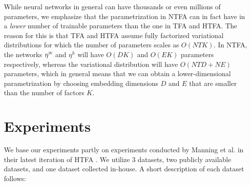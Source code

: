 \documentclass{article}
\newcommand{\scw}{\textsc{w}}
\begin{document}
While neural networks in general can have thousands or even millions of parameters, we emphasize that the parametrization in NTFA can in fact have in a \emph{lower} number of trainable parameters than the one in TFA and HTFA. The reason for this is that TFA and HTFA assume fully factorized variational distributions for which the number of parameters scales as $O(N T K)$. In NTFA, the networks $\eta^\scw$ and $\eta^h$ will have $O(DK)$ and $O(EK)$ parameters respectively, whereas the variational distribution will have $O(N T D + N E)$ parameters, which in general means that we can obtain a lower-dimensional parametrization by choosing embedding dimensions $D$ and $E$ that are smaller than the number of factors $K$. 
 

\section{Experiments}

We base our experiments partly on experiments conducted by Manning et al. in their latest iteration of HTFA \cite{}. We utilize 3 datasets, two publicly available datasets, and one dataset collected in-house. A short description of each dataset follows: 
\end{document}
